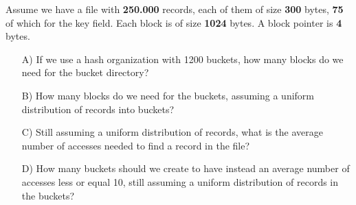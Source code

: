 \begin{exercise}
    Assume we have a file with \textbf{250.000} records, each of them of size \textbf{300} bytes, \textbf{75} of which for the key field. Each block is of size \textbf{1024} bytes. A block pointer is \textbf{4} bytes.
    \begin{itemize}
        \item [A)] If we use a hash organization with 1200 buckets, how many blocks do we need for the bucket directory?
        \item [B)] How many blocks do we need for the buckets, assuming a uniform distribution of records into buckets?
        \item [C)] Still assuming a uniform distribution of records, what is the average number of accesses needed to find a record in the file?
        \item [D)] How many buckets should we create to have instead an average number of accesses less or equal 10, still assuming a uniform distribution of records in the buckets?
    \end{itemize}
\end{exercise}
